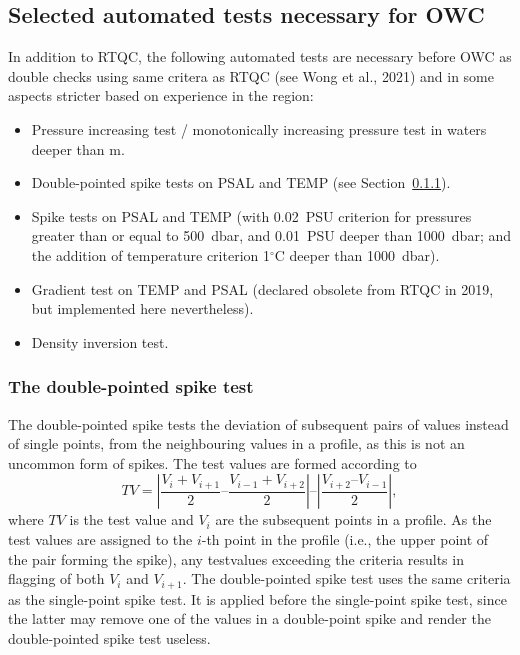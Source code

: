 \documentclass{article}
\begin{document}
\subsection{Selected automated tests necessary for OWC}
In addition to RTQC, the following automated tests are necessary before 
OWC as double checks using same critera as RTQC (see Wong et al., 2021)
and in some aspects stricter based on experience in the region:
\begin{itemize}
\item Pressure increasing test / monotonically increasing pressure test in
  waters deeper than m.
\item Double-pointed spike tests on PSAL and TEMP (see Section~\ref{sec:double-pointed-spike-test}).
\item Spike tests on PSAL and TEMP (with 0.02~PSU criterion for pressures
  greater than or equal to 500~dbar, and 0.01~PSU deeper than 1000~dbar;
  and the addition of temperature criterion 1$^\circ$C deeper than 1000~dbar).
\item Gradient test on TEMP and PSAL (declared obsolete from RTQC in 2019,
  but implemented here nevertheless).
\item Density inversion test.
\end{itemize}

\subsubsection{The double-pointed spike test}\label{sec:double-pointed-spike-test}
The double-pointed spike tests the deviation of subsequent pairs of values
instead of single points, from the neighbouring values in a profile, as
this is not an uncommon form of spikes. The test values are formed
according to 
\begin{equation}
  \label{eq:1}
  TV = \left|\frac{V_{i} + V_{i+1}}{2} – \frac{V_{i-1} + V_{i+2}}{2}\right|  – \left|\frac{V_{i+2} – V_{i-1}}{2}\right| ,
\end{equation}
where $TV$ is the test value and $V_i$ are the subsequent points in a
profile. As the test values are assigned to the $i$-th point in the
profile (i.e., the upper point of the pair forming the spike), any testvalues
exceeding the criteria results in flagging of both $V_i$ and $V_{i+1}$.
%
The double-pointed spike test uses the same criteria as the single-point spike test.
It is applied before the single-point spike test, since the latter may remove
one of the values in a double-point spike and render the double-pointed spike
test useless.
\end{document}
